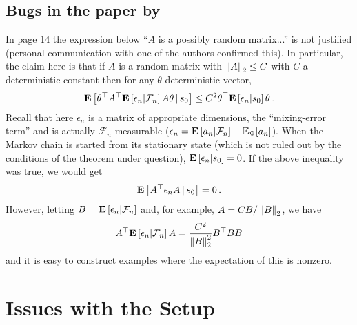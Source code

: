 \documentclass{article}
\begin{document}
\subsection{Bugs in the paper by  \cite{lstdicmla}}
In page 14 the expression below ``$A$ is a possibly random matrix...'' is not justified (personal communication with one of the authors confirmed this).  In particular, the claim here is that if $A$ is a random matrix with $\left\| A\right\|_2\le C$ with $C$ a deterministic constant then for any $\theta$ deterministic vector,
\begin{align*}
\mathbf{E}\left[ \theta^\top A^\top \mathbf{E}\left[ \epsilon_n | \mathcal{F}_n \right] A \theta \,|\, s_0 \right] \le C^2 \theta^\top \mathbf{E}\left[ \epsilon_n|s_0 \right] \theta\,.
\end{align*}
Recall that here $\epsilon_n$ is a matrix of appropriate dimensions, the ``mixing-error term''
and is actually $\mathcal{F}_n$ measurable ($\epsilon_n = \mathbf{E}\left[ a_n | \mathcal{F}_n \right] - \mathbb{E}_{\Psi}[a_n]$). 
When the Markov chain is started from its stationary state 
(which is not ruled out by the conditions of the theorem under question), $\mathbf{E}\left[ \epsilon_n|s_0 \right] = 0$.
If the above inequality was true, we would get 
\begin{align*}
\mathbf{E}\left[ A^\top \epsilon_n  A  \,|\, s_0 \right] = 0\,.
\end{align*}
However, letting $B = \mathbf{E}\left[\epsilon_n|\mathcal{F}_n\right]$ and, for example,
$A = C B/\left\|  B \right\|_2$, we have 
\begin{align*}
A^\top \mathbf{E}\left[ \epsilon_n | \mathcal{F}_n \right] A  = \frac{C^2}{\left\|  B \right\|_2^2} B^\top B B
\end{align*}
and it is easy to construct examples where the expectation of this is nonzero.

\section{Issues with the Setup}
\end{document}
